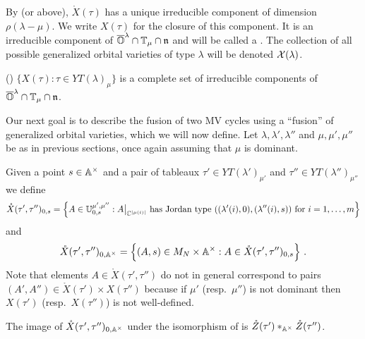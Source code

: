 \documentclass{article}
\begin{document}
By \cite[Prop.\ 4.5.4]{dthesis} (or  above), $ \mathring X(\tau) $ has a unique irreducible component of dimension $ \rho(\lambda - \mu)$.  We write $ X(\tau)$ for the closure of this component.  It is an irreducible component of $ \overline{\OO}^\lambda \cap \TT_\mu \cap \n$ and will be called a . 
% 
The collection of all possible generalized orbital varieties of type $\lambda$ will be denoted $\cX(\lambda)$. 
% 
\begin{theorem}\label{pr:generalized orbital varietiesasirrecs} (\cite[Theorem~4.8.2]{dthesis})
    $\{X(\tau) : \tau \in YT(\lambda)_\mu \}$ is a complete set of irreducible components of $\overline{\OO}^\lambda\cap\TT_\mu\cap\n$. 
\end{theorem}
% 
Our next goal is to describe the fusion of two MV cycles using a ``fusion'' of generalized orbital varieties, which we will now define. 
Let $\lambda,\lambda',\lambda''$ and $\mu, \mu',\mu''$ be as in previous sections, once again assuming that $\mu$ is dominant.
% 

Given a point $s\in\Ax$ and a pair of tableaux $\tau'\in YT(\lambda')_{\mu'}$ and $\tau''\in YT(\lambda'')_{\mu''}$ we define
% 
\begin{equation*}
    \mathring X(\tau',\tau'')_{0,s} = \left\{A\in\UU_{0,s}^{\mu',\mu''} : A \big|_{\CC^{|\mu(i)|}} 
    \text{ has Jordan type } ((\lambda'(i), 0), (\lambda''(i), s)) \text{ for } i=1,\dots,m\right\}
\end{equation*}
% 
and
\begin{equation*}
    \mathring X(\tau',\tau'')_{0,\AA^\times} = 
    \left\{
        (A,s)\in M_N \times \AA^\times: 
        A \in \mathring X(\tau',\tau'')_{0,s} 
    \right\}\,.
\end{equation*}
% 
Note that elements $A\in\mathring X(\tau',\tau'')$ do not in general correspond to pairs $(A',A'')\in\mathring X(\tau')\times X(\tau'')$ because if $\mu'$ (resp.\ $\mu''$) is not dominant then $X(\tau')$ (resp.\ $X(\tau'')$) is not well-defined. 
% 
\begin{proposition}\label{pr:XttZtt}
    The image of $\mathring X(\tau',\tau'')_{0,\AA^\times}$ under the isomorphism of  is $\mathring Z(\tau')\ast_{\AA^\times} \mathring Z(\tau'')$. 
\end{proposition}
% 
\end{document}
